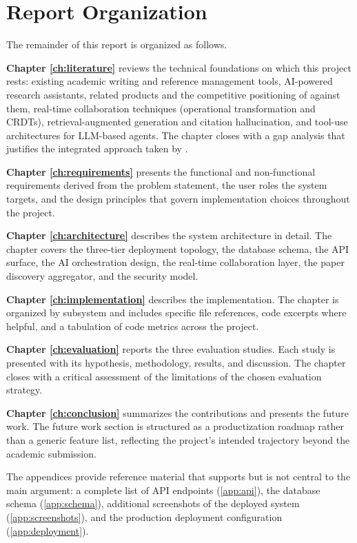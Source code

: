 \section{Report Organization}
\label{sec:organization}

The remainder of this report is organized as follows.

\textbf{Chapter \ref{ch:literature}} reviews the technical foundations on which this project rests: existing academic writing and reference management tools, AI-powered research assistants, related products and the competitive positioning of \sh{} against them, real-time collaboration techniques (operational transformation and CRDTs), retrieval-augmented generation and citation hallucination, and tool-use architectures for LLM-based agents. The chapter closes with a gap analysis that justifies the integrated approach taken by \sh{}.

\textbf{Chapter \ref{ch:requirements}} presents the functional and non-functional requirements derived from the problem statement, the user roles the system targets, and the design principles that govern implementation choices throughout the project.

\textbf{Chapter \ref{ch:architecture}} describes the system architecture in detail. The chapter covers the three-tier deployment topology, the database schema, the API surface, the AI orchestration design, the real-time collaboration layer, the paper discovery aggregator, and the security model.

\textbf{Chapter \ref{ch:implementation}} describes the implementation. The chapter is organized by subsystem and includes specific file references, code excerpts where helpful, and a tabulation of code metrics across the project.

\textbf{Chapter \ref{ch:evaluation}} reports the three evaluation studies. Each study is presented with its hypothesis, methodology, results, and discussion. The chapter closes with a critical assessment of the limitations of the chosen evaluation strategy.

\textbf{Chapter \ref{ch:conclusion}} summarizes the contributions and presents the future work. The future work section is structured as a productization roadmap rather than a generic feature list, reflecting the project's intended trajectory beyond the academic submission.

The appendices provide reference material that supports but is not central to the main argument: a complete list of API endpoints (\ref{app:api}), the database schema (\ref{app:schema}), additional screenshots of the deployed system (\ref{app:screenshots}), and the production deployment configuration (\ref{app:deployment}).
